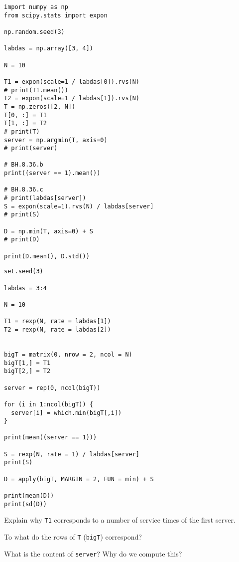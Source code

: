 \documentclass[assignments]{subfiles}
\begin{document}
\begin{verbatim}
import numpy as np
from scipy.stats import expon

np.random.seed(3)

labdas = np.array([3, 4])

N = 10

T1 = expon(scale=1 / labdas[0]).rvs(N)
# print(T1.mean())
T2 = expon(scale=1 / labdas[1]).rvs(N)
T = np.zeros([2, N])
T[0, :] = T1
T[1, :] = T2
# print(T)
server = np.argmin(T, axis=0)
# print(server)

# BH.8.36.b
print((server == 1).mean())

# BH.8.36.c
# print(labdas[server])
S = expon(scale=1).rvs(N) / labdas[server]
# print(S)

D = np.min(T, axis=0) + S
# print(D)

print(D.mean(), D.std())
\end{verbatim}

\begin{verbatim}
set.seed(3)

labdas = 3:4

N = 10

T1 = rexp(N, rate = labdas[1])
T2 = rexp(N, rate = labdas[2])


bigT = matrix(0, nrow = 2, ncol = N)
bigT[1,] = T1
bigT[2,] = T2

server = rep(0, ncol(bigT))

for (i in 1:ncol(bigT)) {
  server[i] = which.min(bigT[,i])
}

print(mean((server == 1)))

S = rexp(N, rate = 1) / labdas[server]
print(S)

D = apply(bigT, MARGIN = 2, FUN = min) + S

print(mean(D))
print(sd(D))
\end{verbatim}

\begin{exercise}
Explain why  \texttt{T1} corresponds to a number of service times of the first server.
\end{exercise}

\begin{exercise}
To what do the rows of \texttt{T} (\texttt{bigT}) correspond?
\end{exercise}

\begin{exercise}
What is the content of \texttt{server}? Why do we compute this?
\end{exercise}
\end{document}
